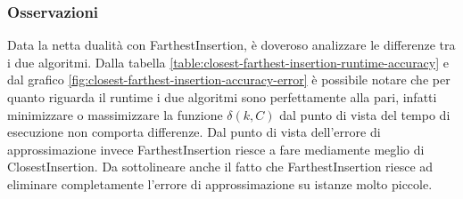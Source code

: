 \subsubsection{Osservazioni}

Data la netta dualità con FarthestInsertion, è doveroso analizzare
le differenze tra i due algoritmi. Dalla tabella 
\ref{table:closest-farthest-insertion-runtime-accuracy} 
e dal grafico \ref{fig:closest-farthest-insertion-accuracy-error}
è possibile notare che per quanto riguarda il runtime i due algoritmi
sono perfettamente alla pari, infatti minimizzare o massimizzare la
funzione $\delta (k, C)$ dal punto di vista del tempo di esecuzione
non comporta differenze. Dal punto di vista dell'errore di 
approssimazione invece FarthestInsertion riesce a fare mediamente
meglio di ClosestInsertion. Da sottolineare anche il fatto che 
FarthestInsertion riesce ad eliminare completamente l'errore di
approssimazione su istanze molto piccole.

